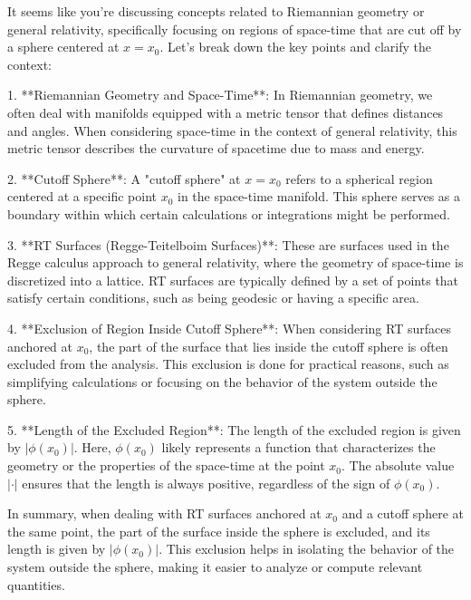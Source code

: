 It seems like you're discussing concepts related to Riemannian geometry or general relativity, specifically focusing on regions of space-time that are cut off by a sphere centered at \( x = x_0 \). Let's break down the key points and clarify the context:

1. **Riemannian Geometry and Space-Time**: In Riemannian geometry, we often deal with manifolds equipped with a metric tensor that defines distances and angles. When considering space-time in the context of general relativity, this metric tensor describes the curvature of spacetime due to mass and energy.

2. **Cutoff Sphere**: A "cutoff sphere" at \( x = x_0 \) refers to a spherical region centered at a specific point \( x_0 \) in the space-time manifold. This sphere serves as a boundary within which certain calculations or integrations might be performed.

3. **RT Surfaces (Regge-Teitelboim Surfaces)**: These are surfaces used in the Regge calculus approach to general relativity, where the geometry of space-time is discretized into a lattice. RT surfaces are typically defined by a set of points that satisfy certain conditions, such as being geodesic or having a specific area.

4. **Exclusion of Region Inside Cutoff Sphere**: When considering RT surfaces anchored at \( x_0 \), the part of the surface that lies inside the cutoff sphere is often excluded from the analysis. This exclusion is done for practical reasons, such as simplifying calculations or focusing on the behavior of the system outside the sphere.

5. **Length of the Excluded Region**: The length of the excluded region is given by \( |\phi(x_0)| \). Here, \( \phi(x_0) \) likely represents a function that characterizes the geometry or the properties of the space-time at the point \( x_0 \). The absolute value \( |\cdot| \) ensures that the length is always positive, regardless of the sign of \( \phi(x_0) \).

In summary, when dealing with RT surfaces anchored at \( x_0 \) and a cutoff sphere at the same point, the part of the surface inside the sphere is excluded, and its length is given by \( |\phi(x_0)| \). This exclusion helps in isolating the behavior of the system outside the sphere, making it easier to analyze or compute relevant quantities.